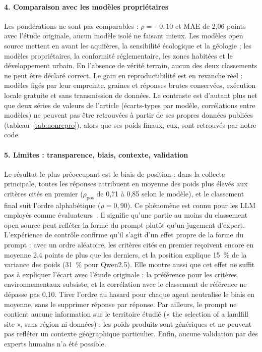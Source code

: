 \documentclass[11pt,a4paper]{article}
\begin{document}
\paragraph{4. Comparaison avec les modèles propriétaires} Les pondérations ne sont pas comparables : $\rho=-0{,}10$ et MAE de 2,06 points avec l'étude originale, aucun modèle isolé ne faisant mieux. Les modèles open source mettent en avant les aquifères, la sensibilité écologique et la géologie ; les modèles propriétaires, la conformité réglementaire, les zones habitées et le développement urbain. En l'absence de vérité terrain, aucun des deux classements ne peut être déclaré correct. Le gain en reproductibilité est en revanche réel : modèles figés par leur empreinte, graines et réponses brutes conservées, exécution locale gratuite et sans transmission de données. Le contraste est d'autant plus net que deux séries de valeurs de l'article (écarts-types par modèle, corrélations entre modèles) ne peuvent pas être retrouvées à partir de ses propres données publiées (tableau~\ref{tab:nonrepro}), alors que ses poids finaux, eux, sont retrouvés par notre code.

\paragraph{5. Limites : transparence, biais, contexte, validation} Le résultat le plus préoccupant est le biais de position : dans la collecte principale, toutes les réponses attribuent en moyenne des poids plus élevés aux critères cités en premier ($\rho_{\mathrm{pos}}$ de 0,71 à 0,85 selon le modèle), et le classement final suit l'ordre alphabétique ($\rho=0{,}90$). Ce phénomène est connu pour les LLM employés comme évaluateurs~\cite{zheng}. Il signifie qu'une partie au moins du classement open source peut refléter la forme du prompt plutôt qu'un jugement d'expert.
L'expérience de contrôle confirme qu'il s'agit d'un effet propre de la forme du prompt : avec un ordre aléatoire, les critères cités en premier reçoivent encore en moyenne 2,4 points de plus que les derniers, et la position explique 15~\% de la variance des poids (31~\% pour Qwen2.5). Elle montre aussi que cet effet ne suffit pas à expliquer l'écart avec l'étude originale : la préférence pour les critères environnementaux subsiste, et la corrélation avec le classement de référence ne dépasse pas 0,10. Tirer l'ordre au hasard pour chaque agent neutralise le biais en moyenne, sans le supprimer réponse par réponse.
Par ailleurs, le prompt ne contient aucune information sur le territoire étudié (« the selection of a landfill site », sans région ni données) : les poids produits sont génériques et ne peuvent pas refléter un contexte géographique particulier. Enfin, aucune validation par des experts humains n'a été possible.
\end{document}
